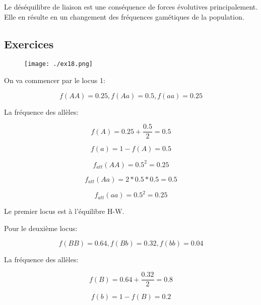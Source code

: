 \documentclass{article}
\begin{document}
Le déséquilibre de liaison est une conséquence de forces évolutives principalement. Elle en résulte en un changement des fréquences gamétiques de la population.

\subsection{Exercices}

\begin{figure}[H]
\texttt{[image: ./ex18.png]}
\end{figure}

On va commencer par le locus 1:

\begin{equation}
f(AA) = 0.25, f(Aa) = 0.5, f(aa) = 0.25
\end{equation}

La fréquence des allèles:

\begin{equation}
f(A) = 0.25 + \frac{0.5}{2} = 0.5
\end{equation}

\begin{equation}
f(a) = 1 - f(A) = 0.5
\end{equation}

\begin{equation}
f_{att}(AA) = 0.5^2 = 0.25
\end{equation}

\begin{equation}
f_{att}(Aa) = 2 * 0.5 * 0.5 = 0.5
\end{equation}

\begin{equation}
f_{att}(aa) = 0.5^2 = 0.25
\end{equation}

Le premier locus est à l'équilibre H-W.

Pour le deuxième locus:

\begin{equation}
f(BB) = 0.64, f(Bb) = 0.32, f(bb) = 0.04
\end{equation}

La fréquence des allèles:

\begin{equation}
f(B) = 0.64 + \frac{0.32}{2} = 0.8
\end{equation}

\begin{equation}
f(b) = 1 - f(B) = 0.2
\end{equation}
\end{document}
